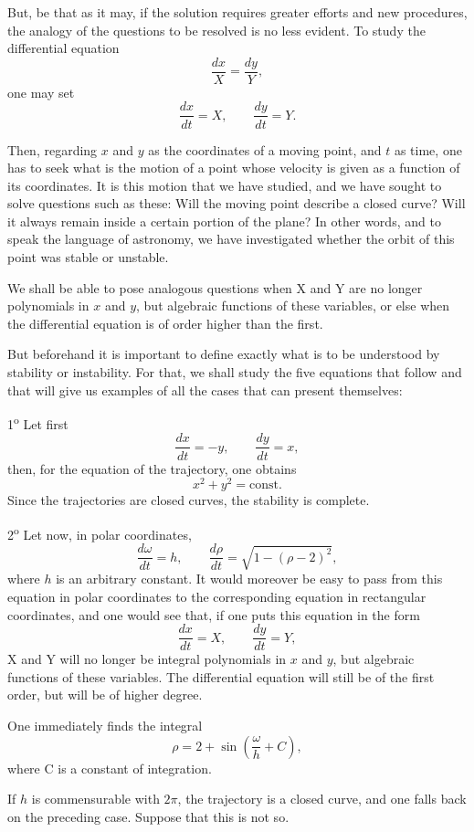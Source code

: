 \documentclass[11pt]{article}
\begin{document}
But, be that as it may, if the solution requires greater efforts and new procedures, the analogy of the questions to be resolved is no less evident. To study the differential equation
\[
\frac{dx}{X}=\frac{dy}{Y},
\]
one may set
\[
\frac{dx}{dt}=X,
\qquad
\frac{dy}{dt}=Y.
\]

Then, regarding $x$ and $y$ as the coordinates of a moving point, and $t$ as time, one has to seek what is the motion of a point whose velocity is given as a function of its coordinates. It is this motion that we have studied, and we have sought to solve questions such as these: Will the moving point describe a closed curve? Will it always remain inside a certain portion of the plane? In other words, and to speak the language of astronomy, we have investigated whether the orbit of this point was stable or unstable.

We shall be able to pose analogous questions when X and Y are no longer polynomials in $x$ and $y$, but algebraic functions of these variables, or else when the differential equation is of order higher than the first.

But beforehand it is important to define exactly what is to be understood by stability or instability. For that, we shall study the five equations that follow and that will give us examples of all the cases that can present themselves:

1\textsuperscript{o} Let first
\[
\frac{dx}{dt}=-y,
\qquad
\frac{dy}{dt}=x,
\]
then, for the equation of the trajectory, one obtains
\[
x^2+y^2=\mathrm{const.}
\]
Since the trajectories are closed curves, the stability is complete.

2\textsuperscript{o} Let now, in polar coordinates,
\[
\frac{d\omega}{dt}=h,
\qquad
\frac{d\rho}{dt}=\sqrt{1-(\rho-2)^2},
\]
where $h$ is an arbitrary constant. It would moreover be easy to pass from this equation in polar coordinates to the corresponding equation in rectangular coordinates, and one would see that, if one puts this equation in the form
\[
\frac{dx}{dt}=X,
\qquad
\frac{dy}{dt}=Y,
\]
X and Y will no longer be integral polynomials in $x$ and $y$, but algebraic functions of these variables. The differential equation will still be of the first order, but will be of higher degree.

One immediately finds the integral
\[
\rho=2+\sin\left(\frac{\omega}{h}+C\right),
\]
where C is a constant of integration.

If $h$ is commensurable with $2\pi$, the trajectory is a closed curve, and one falls back on the preceding case. Suppose that this is not so.
\end{document}
